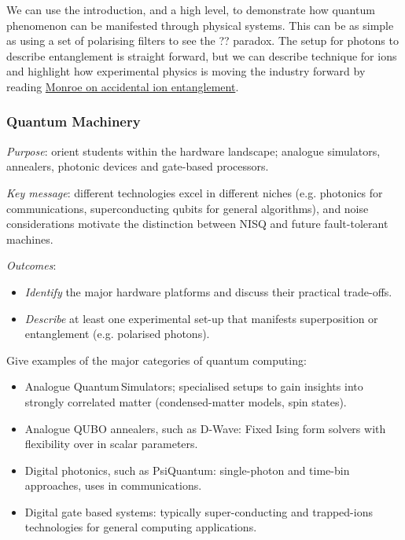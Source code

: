 We can use the introduction, and a high level, to demonstrate how quantum phenomenon can be manifested through physical systems.
This can be as simple as using a set of polarising filters to see the ?? paradox.  
The setup for photons to describe entanglement is straight forward, 
but we can describe technique for ions and highlight how experimental physics is moving the industry forward 
by reading \href{http://scienceblogs.com/principles/2009/07/07/entanglement-by-accident/}{Monroe on accidental ion entanglement}.

\subsubsection*{Quantum Machinery}

\emph{Purpose}: orient students within the hardware landscape; analogue simulators, annealers, photonic devices and gate-based processors.

\emph{Key message}: different technologies excel in different niches 
(e.g. photonics for communications, superconducting qubits for general algorithms), 
and noise considerations motivate the distinction between NISQ and future fault-tolerant machines.

\emph{Outcomes}:
\begin{itemize}
	\item \emph{Identify} the major hardware platforms and discuss their practical trade-offs.
	\item \emph{Describe} at least one experimental set-up that manifests superposition or entanglement (e.g. polarised photons).
\end{itemize}

Give examples of the major categories of quantum computing:
\begin{itemize}
	\item Analogue Quantum Simulators; specialised setups to gain insights into strongly correlated matter (condensed-matter models, spin states).
	\item Analogue QUBO annealers, such as D-Wave: Fixed Ising form solvers with flexibility over in scalar parameters.
	\item Digital photonics, such as PsiQuantum: single-photon and time-bin approaches, uses in communications.
	\item Digital gate based systems: typically super-conducting and trapped-ions technologies for general computing applications.
\end{itemize}

